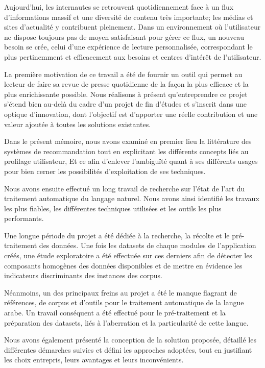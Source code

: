 
Aujourd'hui, les internautes se retrouvent quotidiennement face à un flux d'informations massif et une diversité de contenu très importante; les médias et sites d'actualité y contribuent pleinement. Dans un environnement où l'utilisateur ne dispose toujours pas de moyen satisfaisant pour gérer ce flux, un nouveau besoin se crée, celui d'une expérience de lecture personnalisée, correspondant le plus pertinemment et efficacement aux besoins et centres d'intérêt de l'utilisateur.
 
La première motivation de ce travail a été de fournir un outil qui permet au lecteur de faire sa revue de presse quotidienne de la façon la plus efficace et la plus enrichissante possible. Nous réalisons à présent qu'entreprendre ce projet s'étend bien au-delà du cadre d'un projet de fin d'études et s'inscrit dans une optique d'innovation, dont l'objectif est d'apporter une réelle contribution et une valeur ajoutée à toutes les solutions existantes.
 
Dans le présent mémoire, nous avons examiné en premier lieu la littérature des systèmes de recommandation tout en explicitant les différents concepts liés au profilage utilisateur, Et ce afin d'enlever l'ambiguïté quant à ses différents usages pour bien cerner les possibilités d'exploitation de ses techniques.
 
Nous avons ensuite effectué un long travail de recherche sur l'état de l'art du traitement automatique du langage naturel. Nous avons ainsi identifié les travaux les plus fiables, les différentes techniques utilisées et les outils les plus performants.
 
Une longue période du projet a été dédiée à la recherche, la récolte et le pré-traitement des données. Une fois les datasets de chaque modules de l'application créés, une étude exploratoire a été effectuée sur ces derniers afin de détecter les composants homogènes des données disponibles et de mettre en évidence les indicateurs discriminants des instances des corpus.

Néanmoins, un des principaux freins au projet a été le manque flagrant de références, de corpus et d'outils pour le traitement automatique de la langue arabe. Un travail conséquent a été effectué pour le pré-traitement et la préparation des datasets, liés à l'aberration et la particularité de cette langue.
 
Nous avons également présenté la conception de la solution proposée, détaillé les différentes démarches suivies et défini les approches adoptées, tout en justifiant les choix entrepris, leurs avantages et leurs inconvénients.
 
